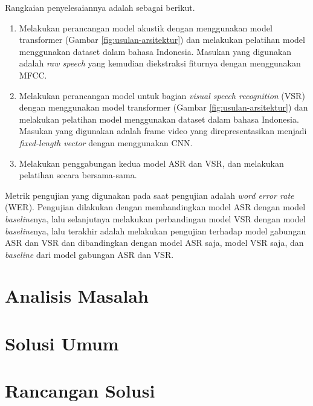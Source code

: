 Rangkaian penyelesaiannya adalah sebagai berikut.
\begin{enumerate}
    \item Melakukan perancangan model akustik dengan menggunakan model transformer (Gambar \ref{fig:usulan-arsitektur}) dan melakukan pelatihan model menggunakan dataset dalam bahasa Indonesia. Masukan yang digunakan adalah \textit{raw speech} yang kemudian diekstraksi fiturnya dengan menggunakan MFCC.
    \item Melakukan perancangan model untuk bagian \textit{visual speech recognition} (VSR) dengan menggunakan model transformer (Gambar \ref{fig:usulan-arsitektur}) dan melakukan pelatihan model menggunakan dataset dalam bahasa Indonesia. Masukan yang digunakan adalah frame video yang direpresentasikan menjadi \textit{fixed-length vector} dengan menggunakan CNN.
    \item Melakukan penggabungan kedua model ASR dan VSR, dan melakukan pelatihan secara bersama-sama.
\end{enumerate}

Metrik pengujian yang digunakan pada saat pengujian adalah \textit{word error rate} (WER). Pengujian dilakukan dengan membandingkan model ASR dengan model \textit{baseline}nya, lalu selanjutnya melakukan perbandingan model VSR dengan model \textit{baseline}nya, lalu terakhir adalah melakukan pengujian terhadap model gabungan ASR dan VSR dan dibandingkan dengan model ASR saja, model VSR saja, dan \textit{baseline} dari model gabungan ASR dan VSR.

\section{Analisis Masalah}
\blindtext

\section{Solusi Umum}
\blindtext

\section{Rancangan Solusi}
\blindtext